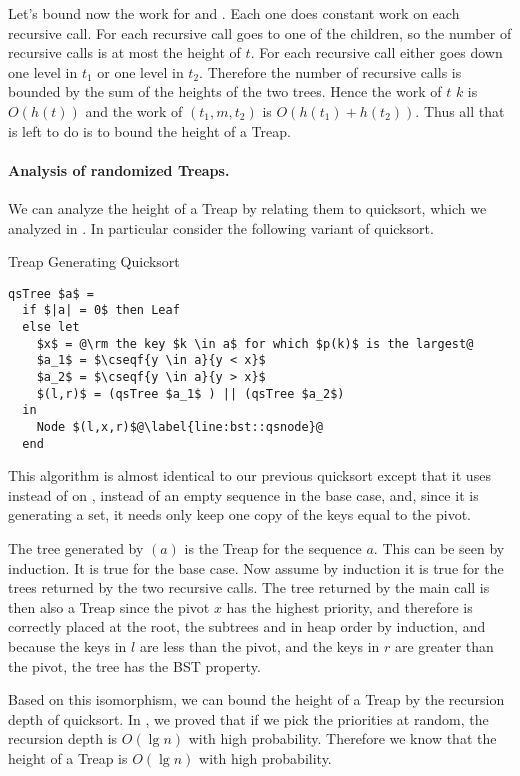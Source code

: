 \begin{chapter}
Let's bound now the work for  and .  
%
Each one does constant work on each recursive call.  
%
For  each recursive call goes to one of the children, so the
number of recursive calls is at most the height of $t$.  
%
For  each recursive call either goes down one level in $t_1$
or one level in $t_2$.  
%
Therefore the number of recursive calls is bounded by the sum of the
heights of the two trees.  
%
Hence the work of  $t$ $k$ is $O(h(t))$ and the work of
$(t_1,m,t_2)$ is $O(h(t_1)+h(t_2))$.  
%
Thus all that is left to do is to bound the height of a Treap.

\paragraph{Analysis of randomized Treaps.}  We can analyze the height
of a Treap by relating them to quicksort, which we analyzed in
.  
%
In particular consider the following variant of
quicksort.
\begin{algorithm}{Treap Generating Quicksort}~
\begin{lstlisting}
qsTree $a$ =
  if $|a| = 0$ then Leaf
  else let
    $x$ = @\rm the key $k \in a$ for which $p(k)$ is the largest@
    $a_1$ = $\cseqf{y \in a}{y < x}$
    $a_2$ = $\cseqf{y \in a}{y > x}$
    $(l,r)$ = (qsTree $a_1$ ) || (qsTree $a_2$)
  in
    Node $(l,x,r)$@\label{line:bst::qsnode}@
  end
\end{lstlisting}
\end{algorithm}
This algorithm is almost identical to our previous quicksort except that it
uses  instead of  on ,
 instead of an empty sequence in the base case, and, since
it is generating a set, it needs only keep one copy of the keys equal
to the pivot.

The tree generated by $(a)$ is the Treap for the sequence
$a$.  
%
This can be seen by induction.  
%
It is true for the base case.
%
Now assume by induction it is true for the trees returned by the two
recursive calls.  
%
The tree returned by the main call is then also a Treap since the
pivot $x$ has the highest priority, and therefore is correctly placed
at the root, the subtrees and in heap order by induction, and because
the keys in $l$ are less than the pivot, and the keys in $r$ are
greater than the pivot, the tree has the BST property.

Based on this isomorphism, we can bound the height of a Treap by the
recursion depth of quicksort.  In , we proved that
if we pick the priorities at random, the recursion depth is
$O(\lg{n})$ with high probability.  Therefore we know that the height
of a Treap is $O(\lg{n})$ with high probability.


\end{chapter}
